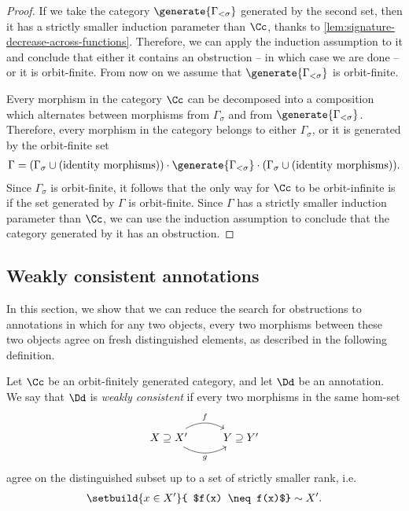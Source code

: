 \begin{proof}
    If we take the category $\generate{\Gamma_{<\sigma}}$ generated by the second set, then it has a strictly smaller induction parameter than $\Cc$, thanks to \cref{lem:signature-decrease-across-functions}. Therefore, we can apply the induction assumption to it and conclude that either it contains an obstruction -- in which case we are done -- or it is orbit-finite. From now on we assume that $\generate{\Gamma_{<\sigma}}$ is orbit-finite. 

    Every morphism in the category $\Cc$ can be decomposed into a composition which alternates between morphisms from $\Gamma_{\sigma}$ and from $\generate{\Gamma_{<\sigma}}$. Therefore, every morphism in the category belongs to either  $\Gamma_{\sigma}$, or it is generated by the orbit-finite set
    \begin{align*}
            \Gamma = (\Gamma_{\sigma} \cup \text{(identity morphisms)}) \cdot \generate{\Gamma_{<\sigma}} \cdot (\Gamma_{\sigma} \cup \text{(identity morphisms)}).
    \end{align*} 
    Since $\Gamma_{\sigma}$ is orbit-finite, it follows that the only way for $\Cc$ to be orbit-infinite is if the set generated by $\Gamma$ is orbit-finite. Since $\Gamma$ has a strictly smaller induction parameter than $\Cc$, we can use the induction assumption to conclude that the category generated by it has an obstruction. 
\end{proof}


\subsection{Weakly consistent annotations}
\label{sec:weakly-consistent-annotations}

In this section, we show that we can reduce the search for obstructions to annotations in which for any two objects, every two morphisms between these two objects agree on fresh distinguished elements, as described in the following definition.


\begin{definition}
    \label{def:weak-consistency}
    Let $\Cc$ be an orbit-finitely generated category, and let $\Dd$ be an annotation. We say that $\Dd$ is \emph{weakly consistent} if every two morphisms in the same hom-set 
    \[
    \begin{tikzcd}
    X \supseteq X' \ar[r, bend left, "f"]
    \ar[r, bend right, "g"'] & Y \supseteq Y'
    \end{tikzcd}
    \]
    agree on the distinguished subset up to a set of strictly smaller rank, i.e. \begin{align*}
     \setbuild{ x \in X'}{ $f(x) \neq f(x)$}  \sim X'.
    \end{align*}
\end{definition}

